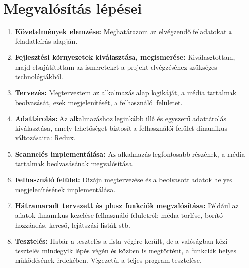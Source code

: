 \section{Megvalósítás lépései}
\begin{enumerate}
    \item {\textbf {Követelmények elemzése: }} Meghatározom az elvégzendő feladatokat a feladatleírás alapján.
    \item {\textbf {Fejlesztési környezetek kiválasztása, megismerése: }} Kiválasztottam, majd elsajátítottam az ismereteket a projekt elvégzéséhez szükséges technológiákból.
    \item {\textbf {Tervezés: }} Megterveztem az alkalmazás alap logikáját, a média tartalmak beolvasását, ezek megjelenítését, a felhasználói felületet.
    \item {\textbf {Adattárolás: }} Az alkalmazáshoz leginkább illő és egyszerű adattárolás kiválasztása, amely lehetőséget biztosít a felhasználói felület dinamikus változásaira: Redux.
    \item {\textbf {Scannelés implementálása: }} Az alkalmazás legfontosabb részének, a média tartalmak beolvasásának megvalósítása.
    \item {\textbf {Felhasználó felület: }} Dizájn megtervezése és a beolvasott adatok helyes megjelenítésének implementálása.
    \item {\textbf {Hátramaradt tervezett és plusz funkciók megvalósítása: }} Például az adatok dinamikus kezelése felhasználó felületről: média törlése, borító hozzáadás, kereső, lejátszási listák stb.
    \item {\textbf {Tesztelés: }} Habár a tesztelés a lista végére került, de a valóságban kézi tesztelés mindegyik lépés végén és közben is megtörtént, a funkciók helyes működésének érdekében. Végezetül a teljes program tesztelése.
\end{enumerate}

\cleardoublepage
